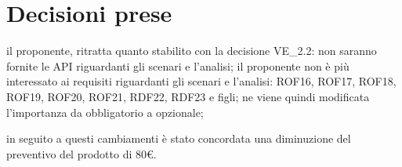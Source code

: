 \documentclass[a4paper,11pt]{article}
\begin{document}
	\section{Decisioni prese}
	\begin{itemize}
		\itemVE il proponente, ritratta quanto stabilito con la decisione VE\_2.2: non saranno fornite le API riguardanti gli scenari e l'analisi;
		\itemVE il proponente non è più interessato ai requisiti riguardanti gli scenari e l'analisi: ROF16, ROF17, ROF18, ROF19, ROF20, ROF21, RDF22, RDF23 e figli; ne viene quindi modificata l'importanza da obbligatorio a opzionale;

		\itemVE in seguito a questi cambiamenti è stato concordata una diminuzione del preventivo del prodotto di 80€.
	\end{itemize}
\end{document}
